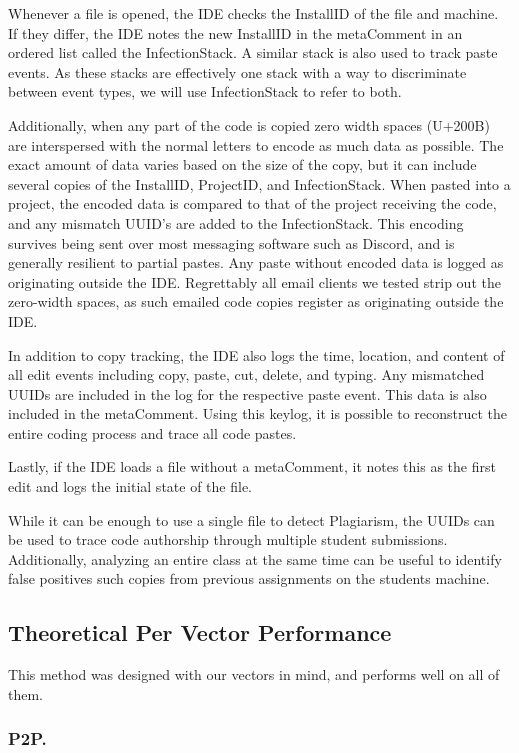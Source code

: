 \documentclass[10pt]{article}
\newcommand{\installID}{InstallID\xspace}
\newcommand{\projectID}{ProjectID\xspace}
\newcommand{\metaComment}{metaComment\xspace}
\newcommand{\infectionStack}{InfectionStack\xspace}
\begin{document}
Whenever a file is opened, the IDE checks the \installID of the file and machine.  If they differ, the IDE notes the new \installID in the \metaComment in an ordered list called the \infectionStack.  A similar stack is also used to track paste events.  As these stacks are effectively one stack with a way to discriminate between event types, we will use \infectionStack to refer to both.

Additionally, when any part of the code is copied zero width spaces (U+200B) are interspersed with the normal letters to encode as much data as possible.  The exact amount of data varies based on the size of the copy, but it can include several copies of the \installID, \projectID, and \infectionStack.  When pasted into a project, the encoded data is compared to that of the project receiving the code, and any mismatch UUID's are added to the \infectionStack. This encoding survives being sent over most messaging software such as Discord, and is generally resilient to partial pastes.  Any paste without encoded data is logged as originating outside the IDE.   Regrettably all email clients we tested strip out the zero-width spaces, as such emailed code copies register as originating outside the IDE. 

In addition to copy tracking, the IDE also logs the time, location, and content of all edit events including copy, paste, cut, delete, and typing.  Any mismatched UUIDs are included in the log for the respective paste event.  This data is also included in the \metaComment.  Using this keylog, it is possible to reconstruct the entire coding process and trace all code pastes.

Lastly, if the IDE loads a file without a \metaComment, it notes this as the first edit and logs the initial state of the file.

While it can be enough to use a single file to detect Plagiarism, the UUIDs can be used to trace code authorship through multiple student submissions.  Additionally, analyzing an entire class at the same time can be useful to identify false positives such copies from previous assignments on the students machine.

\subsection{Theoretical Per Vector Performance}

This method was designed with our vectors in mind, and performs well on all of them.
\subsubsection{P2P.\hspace{0.5em}\phantom{}}
\end{document}
